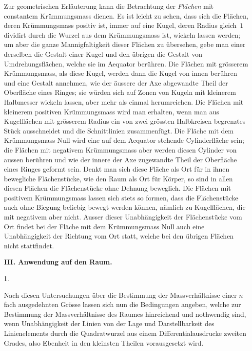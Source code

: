 \documentclass[a4paper,12pt]{article}
\begin{document}
Zur geometrischen Erl\"{a}uterung kann die Betrachtung der
\emph{Fl\"{a}chen} mit constantem Kr\"{u}mmungsmass dienen.  Es
ist leicht zu sehen, dass sich die Fl\"{a}chen, deren
Kr\"{u}mmungsmass positiv ist, immer auf eine Kugel, deren Radius
gleich~$1$ dividirt durch die Wurzel aus dem Kr\"{u}mmungsmass
ist, wickeln lassen werden; um aber die ganze Mannigfaltigkeit
dieser Fl\"{a}chen zu \"{u}bersehen, gebe man einer derselben die
Gestalt einer Kugel und den \"{u}brigen die Gestalt von
Umdrehungsfl\"{a}chen, welche sie im Aequator ber\"{u}hren.  Die
Fl\"{a}chen mit gr\"{o}sserem Kr\"{u}mmungsmass, als diese Kugel,
werden dann die Kugel von innen ber\"{u}hren und eine Gestalt
annehmen, wie der \"{a}ussere der Axe abgewandte Theil der
Oberfl\"{a}che eines Ringes; sie w\"{u}rden sich auf Zonen von
Kugeln mit kleinerem Halbmesser wickeln lassen, aber mehr als
einmal herumreichen.  Die Fl\"{a}chen mit kleinerem positiven
Kr\"{u}mmungsmass wird man erhalten, wenn man aus Kugelfl\"{a}chen
mit gr\"{o}sserem Radius ein von zwei gr\"{o}ssten Halbkreisen
begrenztes St\"{u}ck ausschneidet und die Schnittlinien
zusammenf\"{u}gt.  Die Fl\"{a}che mit dem Kr\"{u}mmungsmass Null
wird eine auf dem Aequator stehende Cylinderfl\"{a}che sein; die
Fl\"{a}chen mit negativem Kr\"{u}mmungsmass aber werden diesen
Cylinder von aussen ber\"{u}hren und wie der innere der Axe
zugewandte Theil der Oberfl\"{a}che eines Ringes geformt sein.
Denkt man sich diese Fl\"{a}che als Ort f\"{u}r in ihnen
bewegliche Fl\"{a}chenst\"{u}cke, wie den Raum als Ort f\"{u}r
K\"{o}rper, so sind in allen diesen Fl\"{a}chen die
Fl\"{a}chenst\"{u}cke ohne Dehnung beweglich.  Die Fl\"{a}chen
mit positivem Kr\"{u}mmungsmass lassen sich stets so formen, dass
die Fl\"{a}chenst\"{u}cke auch ohne Biegung beliebig bewegt
werden k\"{o}nnen, n\"{a}mlich zu Kugelfl\"{a}chen, die mit
negativem aber nicht.  Ausser dieser Unabh\"{a}ngigkeit der
Fl\"{a}chenst\"{u}cke vom Ort findet bei der Fl\"{a}che mit dem
Kr\"{u}mmungsmass Null auch eine Unabh\"{a}ngigkeit der Richtung
vom Ort statt, welche bei den \"{u}brigen Fl\"{a}chen nicht
stattfindet.

\begin{center}
\large\bfseries
III.  Anwendung auf den Raum.
\end{center}

\centerline{1.}

\nobreak\medskip

Nach diesen Untersuchungen \"{u}ber die Bestimmung der
Massverh\"{a}ltnisse einer $n \,$\-fach ausgedehnten Gr\"{o}sse lassen
sich nun die Bedingungen angeben, welche zur Bestimmung der
Massverh\"{a}ltnisse des Raumes hinreichend und nothwendig sind,
wenn Unabh\"{a}ngigkeit der Linien von der Lage und
Darstellbarkeit des Linienelements durch die Quadratwurzel aus
einem Differentialausdrucke zweiten Grades, also Ebenheit in den
kleinsten Theilen vorausgesetzt wird.
\end{document}
